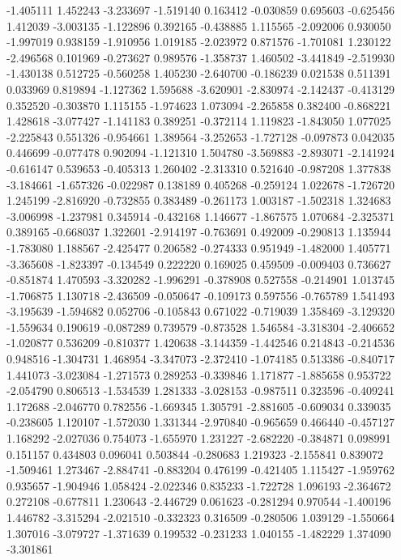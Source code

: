 -1.405111
1.452243
-3.233697
-1.519140
0.163412
-0.030859
0.695603
-0.625456
1.412039
-3.003135
-1.122896
0.392165
-0.438885
1.115565
-2.092006
0.930050
-1.997019
0.938159
-1.910956
1.019185
-2.023972
0.871576
-1.701081
1.230122
-2.496568
0.101969
-0.273627
0.989576
-1.358737
1.460502
-3.441849
-2.519930
-1.430138
0.512725
-0.560258
1.405230
-2.640700
-0.186239
0.021538
0.511391
0.033969
0.819894
-1.127362
1.595688
-3.620901
-2.830974
-2.142437
-0.413129
0.352520
-0.303870
1.115155
-1.974623
1.073094
-2.265858
0.382400
-0.868221
1.428618
-3.077427
-1.141183
0.389251
-0.372114
1.119823
-1.843050
1.077025
-2.225843
0.551326
-0.954661
1.389564
-3.252653
-1.727128
-0.097873
0.042035
0.446699
-0.077478
0.902094
-1.121310
1.504780
-3.569883
-2.893071
-2.141924
-0.616147
0.539653
-0.405313
1.260402
-2.313310
0.521640
-0.987208
1.377838
-3.184661
-1.657326
-0.022987
0.138189
0.405268
-0.259124
1.022678
-1.726720
1.245199
-2.816920
-0.732855
0.383489
-0.261173
1.003187
-1.502318
1.324683
-3.006998
-1.237981
0.345914
-0.432168
1.146677
-1.867575
1.070684
-2.325371
0.389165
-0.668037
1.322601
-2.914197
-0.763691
0.492009
-0.290813
1.135944
-1.783080
1.188567
-2.425477
0.206582
-0.274333
0.951949
-1.482000
1.405771
-3.365608
-1.823397
-0.134549
0.222220
0.169025
0.459509
-0.009403
0.736627
-0.851874
1.470593
-3.320282
-1.996291
-0.378908
0.527558
-0.214901
1.013745
-1.706875
1.130718
-2.436509
-0.050647
-0.109173
0.597556
-0.765789
1.541493
-3.195639
-1.594682
0.052706
-0.105843
0.671022
-0.719039
1.358469
-3.129320
-1.559634
0.190619
-0.087289
0.739579
-0.873528
1.546584
-3.318304
-2.406652
-1.020877
0.536209
-0.810377
1.420638
-3.144359
-1.442546
0.214843
-0.214536
0.948516
-1.304731
1.468954
-3.347073
-2.372410
-1.074185
0.513386
-0.840717
1.441073
-3.023084
-1.271573
0.289253
-0.339846
1.171877
-1.885658
0.953722
-2.054790
0.806513
-1.534539
1.281333
-3.028153
-0.987511
0.323596
-0.409241
1.172688
-2.046770
0.782556
-1.669345
1.305791
-2.881605
-0.609034
0.339035
-0.238605
1.120107
-1.572030
1.331344
-2.970840
-0.965659
0.466440
-0.457127
1.168292
-2.027036
0.754073
-1.655970
1.231227
-2.682220
-0.384871
0.098991
0.151157
0.434803
0.096041
0.503844
-0.280683
1.219323
-2.155841
0.839072
-1.509461
1.273467
-2.884741
-0.883204
0.476199
-0.421405
1.115427
-1.959762
0.935657
-1.904946
1.058424
-2.022346
0.835233
-1.722728
1.096193
-2.364672
0.272108
-0.677811
1.230643
-2.446729
0.061623
-0.281294
0.970544
-1.400196
1.446782
-3.315294
-2.021510
-0.332323
0.316509
-0.280506
1.039129
-1.550664
1.307016
-3.079727
-1.371639
0.199532
-0.231233
1.040155
-1.482229
1.374090
-3.301861
